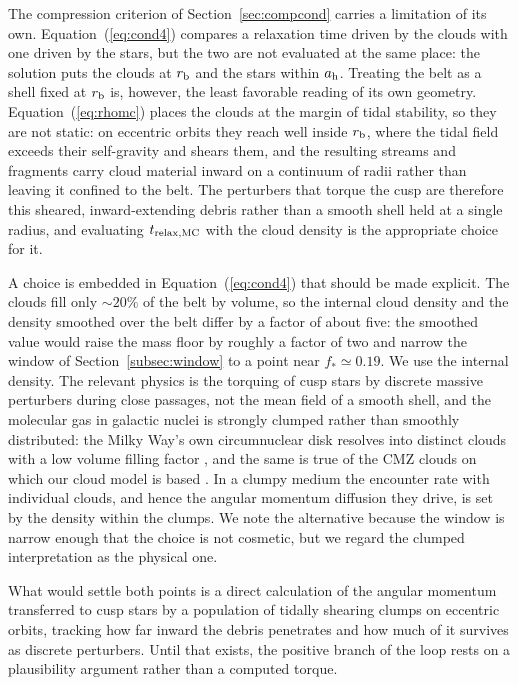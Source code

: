 \documentclass[preprint2]{aastex}
\begin{document}
The compression criterion of Section~\ref{sec:compcond} carries a limitation of its own. Equation~(\ref{eq:cond4}) compares a relaxation time driven by the clouds with one driven by the stars, but the two are not evaluated at the same place: the solution puts the clouds at $r_{\rm b}$ and the stars within $a_{\rm h}$. Treating the belt as a shell fixed at $r_{\rm b}$ is, however, the least favorable reading of its own geometry. Equation~(\ref{eq:rhomc}) places the clouds at the margin of tidal stability, so they are not static: on eccentric orbits they reach well inside $r_{\rm b}$, where the tidal field exceeds their self-gravity and shears them, and the resulting streams and fragments carry cloud material inward on a continuum of radii rather than leaving it confined to the belt. The perturbers that torque the cusp are therefore this sheared, inward-extending debris rather than a smooth shell held at a single radius, and evaluating $t_{\rm relax,MC}$ with the cloud density is the appropriate choice for it.

A choice is embedded in Equation~(\ref{eq:cond4}) that should be made explicit. The clouds fill only $\sim 20\%$ of the belt by volume, so the internal cloud density and the density smoothed over the belt differ by a factor of about five: the smoothed value would raise the mass floor by roughly a factor of two and narrow the window of Section~\ref{subsec:window} to a point near $f_{\ast} \simeq 0.19$. We use the internal density. The relevant physics is the torquing of cusp stars by discrete massive perturbers during close passages, not the mean field of a smooth shell, and the molecular gas in galactic nuclei is strongly clumped rather than smoothly distributed: the Milky Way's own circumnuclear disk resolves into distinct clouds with a low volume filling factor \citep{Christopher:2005a,MonteroCastano:2009a}, and the same is true of the CMZ clouds on which our cloud model is based \citep{Longmore:2013a,Kruijssen:2014a}. In a clumpy medium the encounter rate with individual clouds, and hence the angular momentum diffusion they drive, is set by the density within the clumps. We note the alternative because the window is narrow enough that the choice is not cosmetic, but we regard the clumped interpretation as the physical one.

What would settle both points is a direct calculation of the angular momentum transferred to cusp stars by a population of tidally shearing clumps on eccentric orbits, tracking how far inward the debris penetrates and how much of it survives as discrete perturbers. Until that exists, the positive branch of the loop rests on a plausibility argument rather than a computed torque.
\end{document}
